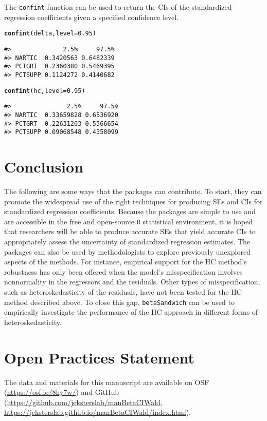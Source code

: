 \documentclass[man]{apa7}\usepackage[]{graphicx}\usepackage[]{xcolor}
\makeatletter
\newcommand{\hlnum}[1]{\textcolor[rgb]{0.686,0.059,0.569}{#1}}%
\newcommand{\hlstd}[1]{\textcolor[rgb]{0.345,0.345,0.345}{#1}}%
\newcommand{\hlkwc}[1]{\textcolor[rgb]{0.333,0.667,0.333}{#1}}%
\newcommand{\hlkwd}[1]{\textcolor[rgb]{0.737,0.353,0.396}{\textbf{#1}}}%
\newenvironment{kframe}{%
 \def\at@end@of@kframe{}%
 \ifinner\ifhmode%
  \def\at@end@of@kframe{\end{minipage}}%
  \begin{minipage}{\columnwidth}%
 \fi\fi%
 \def\FrameCommand##1{\hskip\@totalleftmargin \hskip-\fboxsep
 \colorbox{shadecolor}{##1}\hskip-\fboxsep
     \hskip-\linewidth \hskip-\@totalleftmargin \hskip\columnwidth}%
 \MakeFramed {\advance\hsize-\width
   \@totalleftmargin\z@ \linewidth\hsize
   \@setminipage}}%
 {\par\unskip\endMakeFramed%
 \at@end@of@kframe}
\newenvironment{knitrout}{}{} %
\makeatother
\begin{document}
\noindent The \texttt{confint} function can be used
to return the CIs of the standardized regression coefficients
given a specified confidence level.

\vspace{-.5em}
\begin{minipage}{.75\linewidth}
	\singlespacing
\begin{knitrout}\scriptsize
{}\color{fgcolor}\begin{kframe}
\begin{alltt}
\hlkwd{confint}\hlstd{(delta,} \hlkwc{level} \hlstd{=} \hlnum{0.95}\hlstd{)}
\end{alltt}
\begin{verbatim}
#>              2.5%     97.5%
#> NARTIC  0.3420563 0.6482339
#> PCTGRT  0.2360380 0.5469395
#> PCTSUPP 0.1124272 0.4140682
\end{verbatim}
\begin{alltt}
\hlkwd{confint}\hlstd{(hc,} \hlkwc{level} \hlstd{=} \hlnum{0.95}\hlstd{)}
\end{alltt}
\begin{verbatim}
#>               2.5%     97.5%
#> NARTIC  0.33659828 0.6536920
#> PCTGRT  0.22631203 0.5566654
#> PCTSUPP 0.09068548 0.4358099
\end{verbatim}
\end{kframe}
\end{knitrout}
\end{minipage}
\vspace{-.5em}

\section{Conclusion}

The following are some ways that the packages can contribute.
To start, they can promote the widespread use of the right techniques for producing SEs and CIs for standardized regression coefficients.
Because the packages are simple to use and are accessible in the free and open-source \texttt{R} statistical environment, it is hoped that researchers will be able to produce accurate SEs that yield accurate CIs to appropriately assess the uncertainty of standardized regression estimates.
The packages can also be used by methodologists to explore previously unexplored aspects of the methods. 
For instance,
empirical support for the HC method's robustness has only been offered when the model's misspecification involves nonnormality in the regressors and the residuals.
Other types of misspecification, such as heteroskedasticity of the residuals, have not been tested for the HC method described above.
To close this gap,
\texttt{betaSandwich} can be used to empirically investigate the performance of the HC approach
in different forms of heteroskedasticity.

\section{Open Practices Statement}

The data and materials for this manuscript are available on
OSF
(\url{https://osf.io/8hy7w/})
and
GitHub
(\url{https://github.com/jeksterslab/manBetaCIWald},
\url{https://jeksterslab.github.io/manBetaCIWald/index.html}).

\printbibliography
\end{document}
